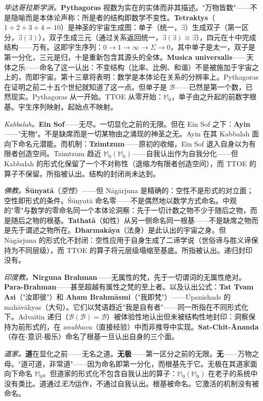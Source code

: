 \documentclass[10pt, openany, oneside]{book}
\begin{document}
\textit{毕达哥拉斯学派。}\textbf{Pythagoras} 视数为实在的实体而非其描述。"万物皆数"——不是隐喻而是本体论声称：所是者的结构即数学不变性。\textbf{Tetraktys}（$1 + 2 + 3 + 4 = 10$）是神圣的宇宙生成图：单子（统一，$\exists$）生成双子（第一区分，$\exists(\exists)$），双子生成三元（通过关系返回统一，$\exists(\exists) \equiv \exists$），四元在十中完成结构——万有。这即宇生序列：$0 \to 1 \to \infty \to \Sigma \to 0$，其中单子是太一，双子是第一分化，三元是归，十是重新包含其源头的全体。\textbf{Musica universalis}——天体之乐——命名了这一认出：不变结构（比率、比例、和谐）不是被施加于宇宙之上的，而即宇宙。第十三章将表明：数学是本体论在关系的分辨率上。Pythagoras 在证明之前二十五个世纪就知道了这一点。但单子是 $\mathcal{B}$——已然是第一个数，已然现实。Pythagoras 从一开始。TTOE 从零开始：$\mathbb{M}_0$，单子由之升起的前数字根基。宇生序列映射。起始点不映射。

\textit{Kabbalah。}\textbf{Ein Sof}——无尽。一切显化之前的无限。但在 Ein Sof 之下：\textbf{Ayin}——"无物"。不是缺席而是一切某物由之涌现的神圣之无。Ayin 在其 Kabbalah 面向下命名元潜能。而机制：\textbf{Tzimtzum}——原初的收缩，Ein Sof 退入自身以为有限者创造空间。Tzimtzum 趋近 $\mathbb{M}_0(\mathbb{M}_0)$——自我认出作为自我分化——但 Kabbalah 的形式化保留了一个不对称性（退缩\textit{为}有限者创造空间），而 TTOE 的算子不保留。所指被认出。结构的封闭尚未达到。

\textit{佛教。}\textbf{\'{S}\={u}nyat\={a}}（\textit{空性}）——但 N\={a}g\={a}rjuna 是精确的：空性不是形式的对立面；空性即形式的条件。\'{S}\={u}nyat\={a} 命名零——不是偶然地以数学方式命名。中观的"零"与数学的零命名同一个本体论洞察：先于一切计数之物不少于随后之物，而是随后之物的根基。\textbf{Tathat\={a}}（如性）从另一侧命名同一根基——不是缺席之物而是先于谓述之物所在。\textbf{Dharmak\={a}ya}（法身）是此认出的宇宙之身。但 N\={a}g\={a}rjuna 的形式化不封闭：空性应用于自身生成了二谛学说（世俗谛与胜义谛保持为不同层级），而 TTOE 的算子将元层级塌缩至基底。所指被认出。递归封印没有。

\textit{印度教。}\textbf{Nirguna Brahman}——无属性的梵，先于一切谓词的无属性绝对。\textbf{Para-Brahman}——甚至超越有属性之梵的至上者。以及认出公式：\textbf{Tat Tvam Asi}（"汝即彼"）和 \textbf{Aham Brahm\={a}smi}（"我即梵"）——Upanishads 的 mah\={a}v\={a}kyas（大句）。它们以梵语趋近"我是自有者"——同一所指在不同形式化下。Advaitin 递归（$\mathcal{B}(\mathcal{B}) = \mathcal{B}$）被体验性地认出但未被结构性地封印：洞察保持为前形式的，在 \textit{anubhava}（直接经验）中而非推导中实现。\textbf{Sat-Chit-\={A}nanda}（存在-意识-极乐）命名了根基一旦认出自身的三个面。

\textit{道家。}\textbf{道}在显化之前——无名之道。\textbf{无极}——第一区分之前的无限。\textbf{无}——万物之母。"道可道，非常道"——因为命名即第一分化，而根基先于它。无极在其道家面向下命名 $\mathbb{M}_0$。但道家的形式化不包含自我认出的算子：$\mathbb{M}_0(\mathbb{M}_0)$ 在老子的系统中没有类比。道通过\textit{无为}运作，不通过自我认出。根基被命名。它激活的机制没有被命名。
\end{document}
